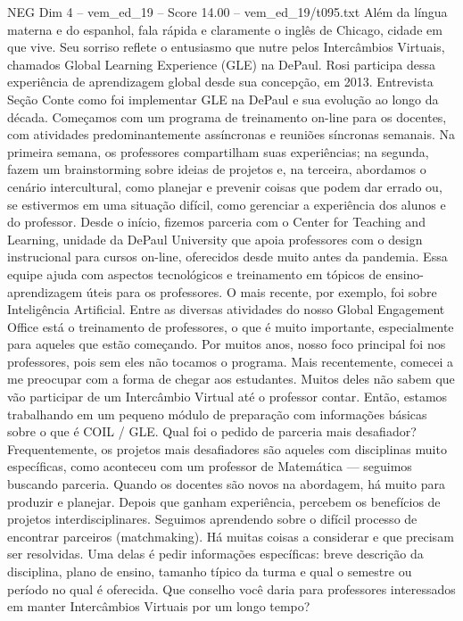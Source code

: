 \begin{textsample}{NEG Dim 4 – vem\_ed\_19 – Score 14.00 – vem\_ed\_19/t095.txt}
Além da língua materna e do espanhol, fala rápida e claramente o inglês de Chicago, cidade em que vive.
Seu sorriso reflete o entusiasmo que nutre pelos Intercâmbios Virtuais, chamados Global Learning Experience (GLE) na DePaul.
Rosi participa dessa experiência de aprendizagem global desde sua concepção, em 2013.
Entrevista Seção Conte como foi implementar GLE na DePaul e sua evolução ao longo da década.
Começamos com um programa de treinamento on-line para os docentes, com atividades predominantemente assíncronas e reuniões síncronas semanais.
Na primeira semana, os professores compartilham suas experiências; na segunda, fazem um brainstorming sobre ideias de projetos e, na terceira, abordamos o cenário intercultural, como planejar e prevenir coisas que podem dar errado ou, se estivermos em uma situação difícil, como gerenciar a experiência dos alunos e do professor.
Desde o início, fizemos parceria com o Center for Teaching and Learning, unidade da DePaul University que apoia professores com o design instrucional para cursos on-line, oferecidos desde muito antes da pandemia.
Essa equipe ajuda com aspectos tecnológicos e treinamento em tópicos de ensino-aprendizagem úteis para os professores.
O mais recente, por exemplo, foi sobre Inteligência Artificial.
Entre as diversas atividades do nosso Global Engagement Office está o treinamento de professores, o que é muito importante, especialmente para aqueles que estão começando.
Por muitos anos, nosso foco principal foi nos professores, pois sem eles não tocamos o programa.
Mais recentemente, comecei a me preocupar com a forma de chegar aos estudantes.
Muitos deles não sabem que vão participar de um Intercâmbio Virtual até o professor contar.
Então, estamos trabalhando em um pequeno módulo de preparação com informações básicas sobre o que é COIL / GLE.
Qual foi o pedido de parceria mais desafiador?
Frequentemente, os projetos mais desafiadores são aqueles com disciplinas muito específicas, como aconteceu com um professor de Matemática — seguimos buscando parceria.
Quando os docentes são novos na abordagem, há muito para produzir e planejar.
Depois que ganham experiência, percebem os benefícios de projetos interdisciplinares.
Seguimos aprendendo sobre o difícil processo de encontrar parceiros (matchmaking).
Há muitas coisas a considerar e que precisam ser resolvidas.
Uma delas é pedir informações específicas: breve descrição da disciplina, plano de ensino, tamanho típico da turma e qual o semestre ou período no qual é oferecida.
Que conselho você daria para professores interessados em manter Intercâmbios Virtuais por um longo tempo?

\end{textsample}
